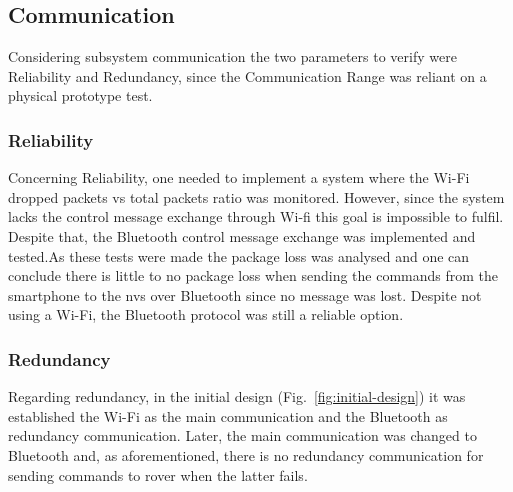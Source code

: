 \subsection{Communication}%
\label{comm-verif}
Considering subsystem communication the two parameters to verify were
Reliability and Redundancy, since the Communication Range was reliant on a physical prototype test.
%
\subsubsection{Reliability}%
\label{comm-verif-reliability}
Concerning Reliability, one needed to implement a system where the Wi-Fi dropped packets vs total packets ratio was monitored. However, since the system lacks the control message exchange through Wi-fi this goal is impossible to fulfil. Despite that, the Bluetooth control message exchange was implemented and tested.As these tests were made the package loss was analysed and one can conclude there is little to no package loss when sending the commands from the smartphone to the \gls{nvs} over Bluetooth since no message was lost. Despite not using a Wi-Fi, the Bluetooth protocol was still a reliable option.
%
\subsubsection{Redundancy}%
\label{comm-verif-redundancy}
Regarding redundancy, in the initial design (Fig.~\ref{fig:initial-design}) it was established the Wi-Fi as the main communication and the Bluetooth as redundancy communication. Later, the main communication was changed to Bluetooth and, as aforementioned, there is no redundancy communication for sending commands to rover when the latter fails.
%
